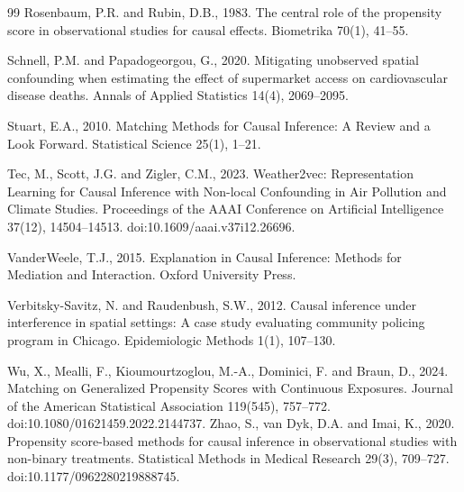 \documentclass{article}
\begin{document}
\begin{thebibliography}{99}
Rosenbaum, P.R. and Rubin, D.B., 1983. The central role of the propensity score in observational studies for causal effects. Biometrika 70(1), 41--55.

Schnell, P.M. and Papadogeorgou, G., 2020. Mitigating unobserved spatial confounding when estimating the effect of supermarket access on cardiovascular disease deaths. Annals of Applied Statistics 14(4), 2069--2095.

Stuart, E.A., 2010. Matching Methods for Causal Inference: A Review and a Look Forward. Statistical Science 25(1), 1--21.

Tec, M., Scott, J.G. and Zigler, C.M., 2023. Weather2vec: Representation Learning for Causal Inference with Non-local Confounding in Air Pollution and Climate Studies. Proceedings of the AAAI Conference on Artificial Intelligence 37(12), 14504--14513. doi:10.1609/aaai.v37i12.26696.

VanderWeele, T.J., 2015. Explanation in Causal Inference: Methods for Mediation and Interaction. Oxford University Press.

Verbitsky-Savitz, N. and Raudenbush, S.W., 2012. Causal inference under interference in spatial settings: A case study evaluating community policing program in Chicago. Epidemiologic Methods 1(1), 107--130.

Wu, X., Mealli, F., Kioumourtzoglou, M.-A., Dominici, F. and Braun, D., 2024. Matching on Generalized Propensity Scores with Continuous Exposures. Journal of the American Statistical Association 119(545), 757--772. doi:10.1080/01621459.2022.2144737.
Zhao, S., van Dyk, D.A. and Imai, K., 2020. Propensity score-based methods for causal inference in observational studies with non-binary treatments. Statistical Methods in Medical Research 29(3), 709--727. doi:10.1177/0962280219888745.

\end{thebibliography}
\end{document}
